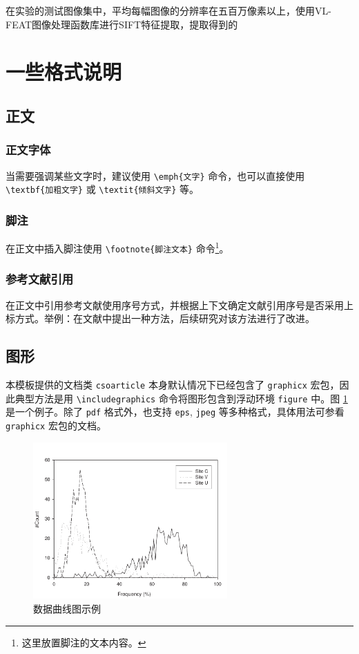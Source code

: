 \documentclass[UTF8]{csoarticle}
\begin{document}
在实验的测试图像集中，平均每幅图像的分辨率在五百万像素以上，使用VL-FEAT图像处理函数库进行SIFT特征提取，提取得到的


\section{一些格式说明}

\subsection{正文}

\subsubsection{正文字体}

当需要强调某些文字时，建议使用 \verb|\emph{文字}| 命令，也可以直接使用 \verb|\textbf{加粗文字}| 或 \verb|\textit{倾斜文字}| 等。

\subsubsection{脚注}

在正文中插入脚注使用 \verb|\footnote{脚注文本}| 命令\footnote{这里放置脚注的文本内容。}。

\subsubsection{参考文献引用}

在正文中引用参考文献使用序号方式，并根据上下文确定文献引用序号是否采用上标方式。举例：在文献\cite{bib1}中提出一种方法，后续研究对该方法进行了改进。

\subsection{图形}

本模板提供的文档类 \verb|csoarticle| 本身默认情况下已经包含了 \verb|graphicx| 宏包，因此典型方法是用 \verb|\includegraphics| 命令将图形包含到浮动环境 \verb|figure| 中。图 \ref{fig:sample} 是一个例子。除了 \verb|pdf| 格式外，也支持 \verb|eps|, \verb|jpeg| 等多种格式，具体用法可参看 \verb|graphicx| 宏包的文档。
\begin{figure}
\centering\includegraphics[height=6cm]{figsamp}
\caption{数据曲线图示例}
\label{fig:sample}
\end{figure}
\end{document}
